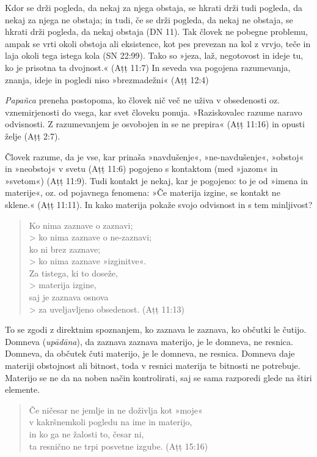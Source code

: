 Kdor se drži pogleda, da nekaj za njega obstaja, se hkrati drži tudi
pogleda, da nekaj za njega ne obstaja; in tudi, če se drži pogleda, da
nekaj ne obstaja, se hkrati drži pogleda, da nekaj obstaja (DN 11). Tak
človek ne pobegne problemu, ampak se vrti okoli obstoja ali eksistence,
kot pes prevezan na kol z vrvjo, teče in laja okoli tega istega kola (SN
22:99). Tako so »jeza, laž, negotovost in ideje tu, ko je prisotna ta
dvojnost.« (Aṭṭ 11:7) In seveda vsa pogojena razumevanja, znanja, ideje
in pogledi niso »brezmadežni« (Aṭṭ 12:4)

\emph{Papañca} preneha postopoma, ko človek nič več ne uživa v
obsedenosti oz. vznemirjenosti do vsega, kar svet človeku ponuja.
»Raziskovalec razume naravo odvisnosti. Z razumevanjem je osvobojen in
se ne prepira« (Aṭṭ 11:16) in opusti želje (Aṭṭ 2:7).

Človek razume, da je vse, kar prinaša »navdušenje«, »ne-navdušenje«,
»obstoj« in »neobstoj« v svetu (Aṭṭ 11:6) pogojeno s kontaktom (med
»jazom« in »svetom«) (Aṭṭ 11:9). Tudi kontakt je nekaj, kar je pogojeno:
to je od »imena in materije«, oz. od pojavnega fenomena: »Če materija
izgine, se kontakt ne sklene.« (Aṭṭ 11:11). In kako materija pokaže
svojo odvisnost in s tem minljivost?

\begin{verse}
Ko nima zaznave o zaznavi;\\> ko nima zaznave o ne-zaznavi;\\
ko ni brez zaznave;\\> ko nima zaznave »izginitve«.\\
Za tistega, ki to doseže,\\> materija izgine,\\
saj je zaznava osnova\\> za uveljavljeno obsedenost. (Aṭṭ 11:13)
\end{verse}

To se zgodi z direktnim spoznanjem, ko zaznava le zaznava, ko občutki le
čutijo. Domneva (\emph{upādāna}), da zaznava zaznava materijo, je le
domneva, ne resnica. Domneva, da občutek čuti materijo, je le domneva,
ne resnica. Domneva daje materiji obstojnost ali bitnost, toda v resnici
materija te bitnosti ne potrebuje. Materijo se ne da na noben način
kontrolirati, saj se sama razporedi glede na štiri elemente.

\begin{verse}
Če ničesar ne jemlje in ne doživlja kot »moje«\\
v kakršnemkoli pogledu na ime in materijo,\\
in ko ga ne žalosti to, česar ni,\\
ta resnično ne trpi posvetne izgube. (Aṭṭ 15:16)
\end{verse}

